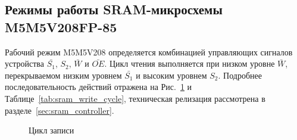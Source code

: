 \subsection{Режимы работы SRAM-микросхемы M5M5V208FP-85}
Рабочий режим M5M5V208 определяется комбинацией управляющих сигналов устройства $\bar{S_1}$, ${S_2}$, $\bar{W}$ и $\bar{OE}$.
Цикл чтения выполняется при низком уровне $\bar{W}$, перекрываемом низким уровнем $\bar{S_1}$ и высоким уровнем ${S_2}$.
Подробнее последовательность действий отражена на Рис.~\ref{pic:sram_write_cycle} и Таблице~\ref{tab:sram_write_cycle}, техническая релизация рассмотрена в
разделе~\ref{sec:sram_controller}.

\begin{figure}[H]
\caption{Цикл записи}
\label{pic:sram_write_cycle}
\end{figure}

